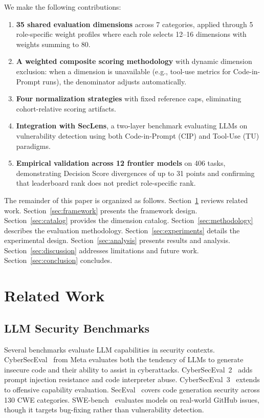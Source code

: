\documentclass[10pt,twocolumn]{article}
\newcommand{\seclens}{SecLens\xspace}
\begin{document}
We make the following contributions:

\begin{enumerate}[noitemsep,topsep=2pt]
    \item \textbf{35 shared evaluation dimensions} across 7 categories, applied through 5 role-specific weight profiles where each role selects 12--16 dimensions with weights summing to 80.
    \item \textbf{A weighted composite scoring methodology} with dynamic dimension exclusion: when a dimension is unavailable (e.g., tool-use metrics for Code-in-Prompt runs), the denominator adjusts automatically.
    \item \textbf{Four normalization strategies} with fixed reference caps, eliminating cohort-relative scoring artifacts.
    \item \textbf{Integration with \seclens}, a two-layer benchmark evaluating LLMs on vulnerability detection using both Code-in-Prompt (CIP) and Tool-Use (TU) paradigms.
    \item \textbf{Empirical validation across 12 frontier models} on 406 tasks, demonstrating Decision Score divergences of up to 31 points and confirming that leaderboard rank does not predict role-specific rank.
\end{enumerate}

The remainder of this paper is organized as follows. Section~\ref{sec:related} reviews related work. Section~\ref{sec:framework} presents the framework design. Section~\ref{sec:catalog} provides the dimension catalog. Section~\ref{sec:methodology} describes the evaluation methodology. Section~\ref{sec:experiments} details the experimental design. Section~\ref{sec:analysis} presents results and analysis. Section~\ref{sec:discussion} addresses limitations and future work. Section~\ref{sec:conclusion} concludes.

\section{Related Work}
\label{sec:related}

\subsection{LLM Security Benchmarks}

Several benchmarks evaluate LLM capabilities in security contexts. CyberSecEval~\citep{bhatt2023cyberseceval} from Meta evaluates both the tendency of LLMs to generate insecure code and their ability to assist in cyberattacks. CyberSecEval~2~\citep{bhatt2024purplellama} adds prompt injection resistance and code interpreter abuse. CyberSecEval~3~\citep{wan2024cyberseceval3} extends to offensive capability evaluation. SecEval~\citep{li2023seceval} covers code generation security across 130 CWE categories. SWE-bench~\citep{jimenez2024swebench} evaluates models on real-world GitHub issues, though it targets bug-fixing rather than vulnerability detection.
\end{document}
